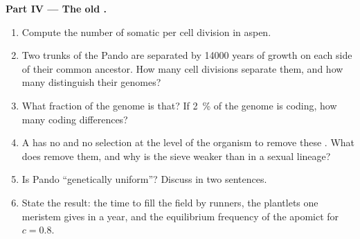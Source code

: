 \begin{problem}
\medskip
\noindent\textbf{Part IV --- The old .}
\begin{enumerate}[resume]
  \item Compute the number of somatic  per cell division in
        aspen.
  \item Two trunks of the Pando  are separated by \num{14000}
        years of growth on each side of their common ancestor. How
        many cell divisions separate them, and how many 
        distinguish their genomes?
  \item What fraction of the genome is that? If \qty{2}{\%} of the
        genome is coding, how many coding differences?
  \item A  has no  and no selection at the level of the
        organism to remove these . What does remove them,
        and why is the sieve weaker than in a sexual lineage?
  \item Is Pando ``genetically uniform''? Discuss in two sentences.
  \item State the result: the time to fill the field by runners, the
        plantlets one meristem gives in a year, and the equilibrium
        frequency of the apomict for $c = 0.8$.
\end{enumerate}
\end{problem}
